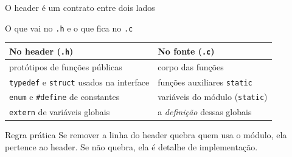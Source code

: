 \documentclass[aspectratio=169]{beamer}
\begin{document}
\begin{frame}{O header é um contrato entre dois lados}
  \begin{center}
  \end{center}
\end{frame}

\begin{frame}{O que vai no \texttt{.h} e o que fica no \texttt{.c}}
  \begin{center}
  \small
  \begin{tabular}{@{}ll@{}}
    \toprule
    \textbf{No header (\texttt{.h})} & \textbf{No fonte (\texttt{.c})} \\
    \midrule
    protótipos de funções públicas   & corpo das funções \\
    \texttt{typedef} e \texttt{struct} usados na interface & funções auxiliares \texttt{static} \\
    \texttt{enum} e \texttt{\#define} de constantes & variáveis do módulo (\texttt{static}) \\
    \texttt{extern} de variáveis globais & a \emph{definição} dessas globais \\
    \bottomrule
  \end{tabular}
  \end{center}
  \begin{block}{Regra prática}
    \small Se remover a linha do header quebra quem usa o módulo, ela pertence
    ao header. Se não quebra, ela é detalhe de implementação.
  \end{block}
\end{frame}
\end{document}
